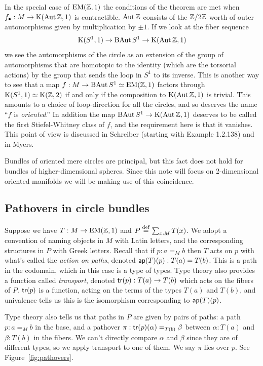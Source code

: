 In the special case of \( \mathrm{EM}(\mathbb{Z},1) \) the conditions of the theorem are met when \( f_\bullet:M\to\mathrm{K}(\operatorname{Aut} \mathbb{Z}, 1) \) is contractible. \( \operatorname{Aut}\mathbb{Z} \) consists of the \( \mathbb{Z}/2\mathbb{Z} \) worth of outer automorphisms given by multiplication by \( \pm 1 \). If we look at the fiber sequence
\[ 
\mathrm{K}(S^1, 1)\to \operatorname{BAut} S^1\to \mathrm{K}(\operatorname{Aut} \mathbb{Z}, 1)
\] we see the automorphisms of the circle as an extension of the group of automorphisms that are homotopic to the identity (which are the torsorial actions) by the group that sends the loop in \( S^1 \) to its inverse. This is another way to see that a map \( f:M\to \operatorname{BAut} S^1\simeq \mathrm{EM}(\mathbb{Z},1) \) factors through \( \mathrm{K}(S^1, 1)\simeq \mathrm{K}(\mathbb{Z},2) \) if and only if the composition to \( \mathrm{K}(\operatorname{Aut}\mathbb{Z},1) \) is trivial. This amounts to a choice of loop-direction for all the circles, and so deserves the name ``\( f \) is \emph{oriented}.'' In addition the map \( \operatorname{BAut} S^1\to \mathrm{K}(\operatorname{Aut} \mathbb{Z}, 1) \) deserves to be called the first Stiefel-Whitney class of \( f \), and the requirement here is that it vanishes. This point of view is discussed in Schreiber\cite{dcct} (starting with Example 1.2.138) and in Myers\cite{myersgood}.

\begin{mynote}
Bundles of oriented mere circles are principal, but this fact does not hold for bundles of higher-dimensional spheres. Since this note will focus on 2-dimensional oriented manifolds we will be making use of this coincidence.
\end{mynote}

\subsection{Pathovers in circle bundles}
\label{sec:pathovers}
Suppose we have \( T:M\to\mathrm{EM}(\mathbb{Z},1) \) and \( P\stackrel{\mathrm{def}}{=}\sum_{x:M}T(x) \). We adopt a convention of naming objects in \( M \) with Latin letters, and the corresponding structures in \( P \) with Greek letters. Recall that if \( p:a=_M b \) then \( T \) acts on \( p \) with what's called the \emph{action on paths}, denoted \( \mathsf{ap}(T)(p):T(a)=T(b) \). This is a path in the codomain, which in this case is a type of types. Type theory also provides a function called \emph{transport}, denoted \( \mathsf{tr}(p):T(a)\to T(b) \) which acts on the fibers of \( P \). \( \mathsf{tr}(p) \) is a function, acting on the terms of the types \( T(a) \) and \( T(b) \), and univalence tells us this is the isomorphism corresponding to \( \mathsf{ap}(T)(p) \).

Type theory also tells us that paths in \( P \) are given by pairs of paths: a path \( p:a=_M b \) in the base, and a pathover \( \pi:\mathsf{tr}(p)(\alpha)=_{T(b)}\beta \) between \( \alpha:T(a) \) and \( \beta:T(b) \) in the fibers. We can't directly compare \( \alpha \) and \( \beta \) since they are of different types, so we apply transport to one of them. We say \( \pi \) lies over \( p \). See Figure~\ref{fig:pathovers}.

